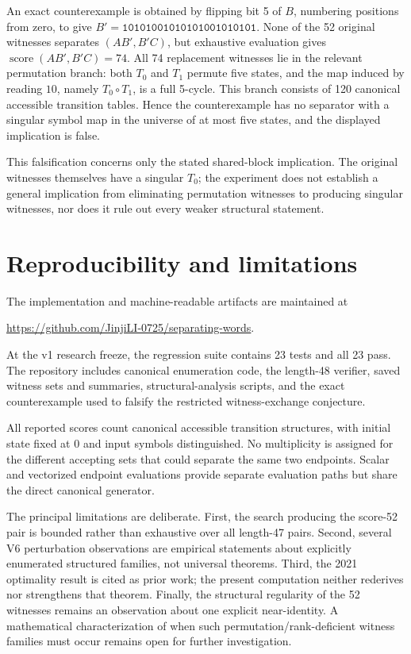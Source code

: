 \documentclass[10pt]{article}
\newcommand{\score}{\operatorname{score}}
\begin{document}
An exact counterexample is obtained by flipping bit 5 of $B$, numbering positions from zero, to give $B'=\texttt{10101001010101001010101}$.  None of the 52 original witnesses separates $(AB',B'C)$, but exhaustive evaluation gives $\score(AB',B'C)=74$.  All 74 replacement witnesses lie in the relevant permutation branch: both $T_0$ and $T_1$ permute five states, and the map induced by reading $10$, namely $T_0\circ T_1$, is a full 5-cycle.  This branch consists of 120 canonical accessible transition tables.  Hence the counterexample has no separator with a singular symbol map in the universe of at most five states, and the displayed implication is false.

This falsification concerns only the stated shared-block implication.  The original witnesses themselves have a singular $T_0$; the experiment does not establish a general implication from eliminating permutation witnesses to producing singular witnesses, nor does it rule out every weaker structural statement.

\section{Reproducibility and limitations}
The implementation and machine-readable artifacts are maintained at
\begin{center}
\url{https://github.com/JinjiLI-0725/separating-words}.
\end{center}
At the v1 research freeze, the regression suite contains 23 tests and all 23 pass.  The repository includes canonical enumeration code, the length-48 verifier, saved witness sets and summaries, structural-analysis scripts, and the exact counterexample used to falsify the restricted witness-exchange conjecture.

All reported scores count canonical accessible transition structures, with initial state fixed at $0$ and input symbols distinguished.  No multiplicity is assigned for the different accepting sets that could separate the same two endpoints.  Scalar and vectorized endpoint evaluations provide separate evaluation paths but share the direct canonical generator.

The principal limitations are deliberate.  First, the search producing the score-52 pair is bounded rather than exhaustive over all length-47 pairs.  Second, several V6 perturbation observations are empirical statements about explicitly enumerated structured families, not universal theorems.  Third, the 2021 optimality result is cited as prior work; the present computation neither rederives nor strengthens that theorem.  Finally, the structural regularity of the 52 witnesses remains an observation about one explicit near-identity.  A mathematical characterization of when such permutation/rank-deficient witness families must occur remains open for further investigation.
\end{document}
